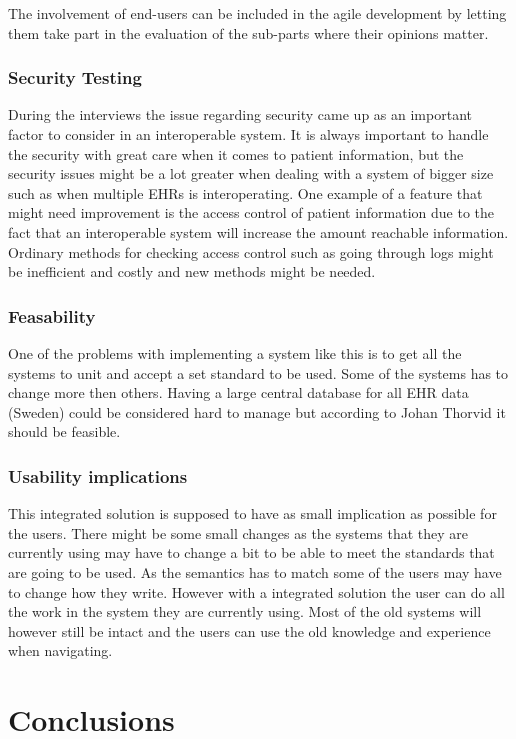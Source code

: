 \documentclass[14pt]{article}
\begin{document}
The involvement of end-users can be included in the agile development by letting them take part in the evaluation of the sub-parts where their opinions matter. 

\subsubsection{Security Testing}
During the interviews the issue regarding security came up as an important factor to consider in an interoperable system. It is always important to handle the security with great care when it comes to patient information, but the security issues might be a lot greater when dealing with a system of bigger size such as when multiple \glspl{EHR} is interoperating. One example of a feature that might need improvement is the access control of patient information due to the fact that an interoperable system will increase the amount reachable information. Ordinary methods for checking access control such as going through logs might be inefficient and costly and new methods might be needed.

\subsubsection{Feasability}
One of the problems with implementing a system like this is to get all the systems to unit and accept a set standard to be used. Some of the systems has to change more then others.
Having a large central database for all EHR data (Sweden) could be considered hard to manage but according to Johan Thorvid it should be feasible.

\subsubsection{Usability implications}
This integrated solution is supposed to have as small implication as possible for the users. There might be some small changes as the systems that they are currently using may have to change a bit to be able to meet the standards that are going to be used. As the semantics has to match some of the users may have to change how they write. However with a integrated solution the user can do all the work in the system they are currently using. Most of the old systems will however still be intact and the users can use the old knowledge and experience when navigating.

\newpage

\section{Conclusions}
\label{sec:Conclusions}



\newpage
\printglossaries
\newpage

\begin{appendix}
\end{appendix}



 
 
\end{document}
